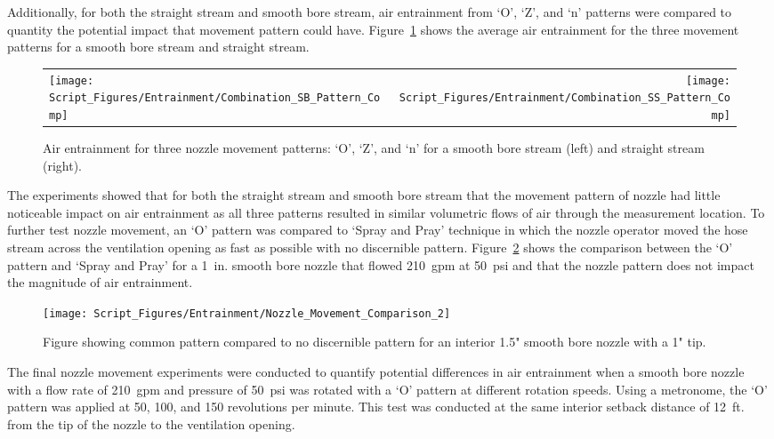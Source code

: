 \documentclass[12pt,oneside]{book}
\begin{document}
Additionally, for both the straight stream and smooth bore stream, air entrainment from `O', `Z', and `n' patterns were compared to quantity the potential impact that movement pattern could have. Figure~\ref{fig:SS_SB_Movement_Comparison} shows the average air entrainment for the three movement patterns for a smooth bore stream and straight stream.

\begin{figure}[!ht]
\begin{tabular*}{\textwidth}{lr}
\texttt{[image: Script\_Figures/Entrainment/Combination\_SB\_Pattern\_Comp]} &
\texttt{[image: Script\_Figures/Entrainment/Combination\_SS\_Pattern\_Comp]} \\
\end{tabular*}
\caption[Air Entrainment Comparison of Movement Patterns]{Air entrainment for three nozzle movement patterns: `O', `Z', and `n' for a smooth bore stream (left) and straight stream (right).}
\label{fig:SS_SB_Movement_Comparison}
\end{figure}

The experiments showed that for both the straight stream and smooth bore stream that the movement pattern of nozzle had little noticeable impact on air entrainment as all three patterns resulted in similar volumetric flows of air through the measurement location. To further test nozzle movement, an `O' pattern was compared to `Spray and Pray' technique in which the nozzle operator moved the hose stream across the ventilation opening as fast as possible with no discernible pattern. Figure~\ref{fig:Nozzle_Movement_PatterntoNoPattern_Comparison} shows the comparison between the `O' pattern and `Spray and Pray' for a 1~in. smooth bore nozzle that flowed 210~gpm at 50~psi and that the nozzle pattern does not impact the magnitude of air entrainment. 

\begin{figure}[!ht]
\centering
\texttt{[image: Script\_Figures/Entrainment/Nozzle\_Movement\_Comparison\_2]}
\caption[Air Entrainment Comparison of `O' Pattern Versus `Spray and Pray']{Figure showing common pattern compared to no discernible pattern for an interior 1.5" smooth bore nozzle with a 1" tip.}
\label{fig:Nozzle_Movement_PatterntoNoPattern_Comparison}
\end{figure}

The final nozzle movement experiments were conducted to quantify potential differences in air entrainment when a smooth bore nozzle with a flow rate of 210~gpm and pressure of 50~psi was rotated with a `O' pattern at different rotation speeds. Using a metronome, the `O' pattern was applied at 50, 100, and 150 revolutions per minute. This test was conducted at the same interior setback distance of 12~ft. from the tip of the nozzle to the ventilation opening.
\end{document}
